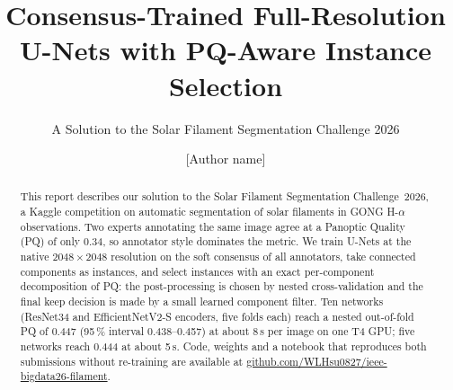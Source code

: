 \documentclass[sigconf]{acmart}
\begin{document}
\title{Consensus-Trained Full-Resolution U-Nets with PQ-Aware Instance Selection}
\subtitle{A Solution to the Solar Filament Segmentation Challenge 2026} %

\author{[Author name]}
\email{[e-mail]}

\begin{abstract}
    This report describes our solution to the Solar Filament Segmentation Challenge~2026, a Kaggle competition on automatic segmentation of solar filaments in GONG H-$\alpha$ observations. Two experts annotating the same image agree at a Panoptic Quality (PQ) of only 0.34, so annotator style dominates the metric. We train U-Nets at the native $2048\times2048$ resolution on the soft consensus of all annotators, take connected components as instances, and select instances with an exact per-component decomposition of PQ: the post-processing is chosen by nested cross-validation and the final keep decision is made by a small learned component filter. Ten networks (ResNet34 and EfficientNetV2-S encoders, five folds each) reach a nested out-of-fold PQ of 0.447 (95\,\% interval 0.438--0.457) at about 8\,s per image on one T4 GPU; five networks reach 0.444 at about 5\,s. Code, weights and a notebook that reproduces both submissions without re-training are available at \href{https://github.com/WLHsu0827/ieee-bigdata26-filament}{github.com/WLHsu0827/ieee-bigdata26-filament}.
\end{abstract}

\maketitle


\end{document}
